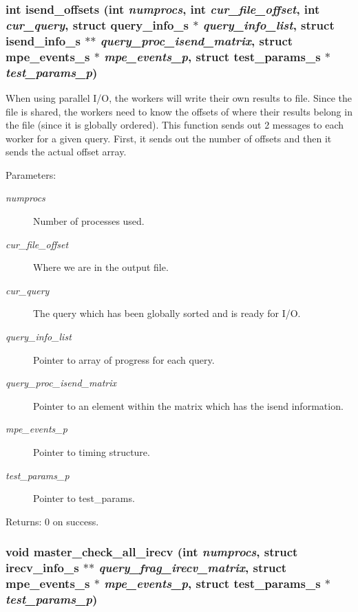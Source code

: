 \subsubsection{\setlength{\rightskip}{0pt plus 5cm}int isend\_\-offsets (int {\em numprocs}, int {\em cur\_\-file\_\-offset}, int {\em cur\_\-query}, struct \bf{query\_\-info\_\-s} $\ast$ {\em query\_\-info\_\-list}, struct \bf{isend\_\-info\_\-s} $\ast$$\ast$ {\em query\_\-proc\_\-isend\_\-matrix}, struct \bf{mpe\_\-events\_\-s} $\ast$ {\em mpe\_\-events\_\-p}, struct \bf{test\_\-params\_\-s} $\ast$ {\em test\_\-params\_\-p})}\label{master__help_8h_8efbf4c27dad84d18e04ed04381b8b86}


When using parallel I/O, the workers will write their own results to file. Since the file is shared, the workers need to know the offsets of where their results belong in the file (since it is globally ordered). This function sends out 2 messages to each worker for a given query. First, it sends out the number of offsets and then it sends the actual offset array.

\begin{Desc}
\item[Parameters:]
\begin{description}
\item[{\em numprocs}]Number of processes used. \item[{\em cur\_\-file\_\-offset}]Where we are in the output file. \item[{\em cur\_\-query}]The query which has been globally sorted and is ready for I/O. \item[{\em query\_\-info\_\-list}]Pointer to array of progress for each query. \item[{\em query\_\-proc\_\-isend\_\-matrix}]Pointer to an element within the matrix which has the isend information. \item[{\em mpe\_\-events\_\-p}]Pointer to timing structure. \item[{\em test\_\-params\_\-p}]Pointer to test\_\-params. \end{description}
\end{Desc}
\begin{Desc}
\item[Returns:]0 on success. \end{Desc}
\subsubsection{\setlength{\rightskip}{0pt plus 5cm}void master\_\-check\_\-all\_\-irecv (int {\em numprocs}, struct \bf{irecv\_\-info\_\-s} $\ast$$\ast$ {\em query\_\-frag\_\-irecv\_\-matrix}, struct \bf{mpe\_\-events\_\-s} $\ast$ {\em mpe\_\-events\_\-p}, struct \bf{test\_\-params\_\-s} $\ast$ {\em test\_\-params\_\-p})}\label{master__help_8h_5135b98552710545bb3cb56c1c460a42}


